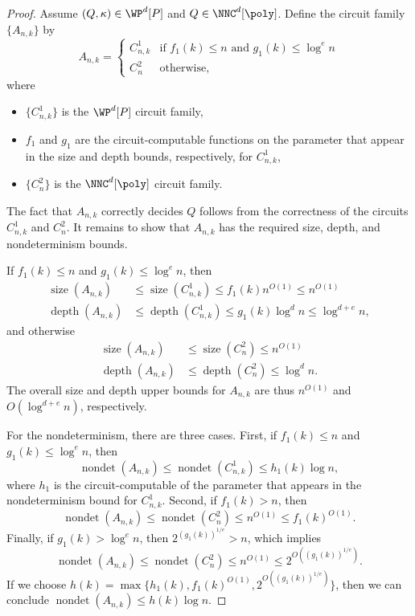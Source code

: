 \documentclass{article}
\DeclareMathOperator{\depth}{depth}
\DeclareMathOperator{\nondet}{nondet}
\DeclareMathOperator{\size}{size}
\begin{document}
\begin{proof}
  Assume $(Q, \kappa) \in \WP^d[P]$ and $Q \in \NNC^d[\poly]$.
  Define the circuit family $\{A_{n, k}\}$ by
  \[
  A_{n, k} =
  \begin{cases}
    C^1_{n, k} & \text{if } f_1(k) \leq n \text{ and } g_1(k) \leq \log^e n \\
    C^2_n & \text{otherwise},
  \end{cases}
  \]
  where
  \begin{itemize}
  \item $\{C^1_{n, k}\}$ is the $\WP^d[P]$ circuit family,
  \item $f_1$ and $g_1$ are the circuit-computable functions on the parameter that appear in the size and depth bounds, respectively, for $C^1_{n, k}$,
  \item $\{C^2_n\}$ is the $\NNC^d[\poly]$ circuit family.
  \end{itemize}
  The fact that $A_{n, k}$ correctly decides $Q$ follows from the correctness of the circuits $C^1_{n, k}$ and $C^2_n$.
  It remains to show that $A_{n, k}$ has the required size, depth, and nondeterminism bounds.

  If $f_1(k) \leq n$ and $g_1(k) \leq \log^e n$, then
  \begin{align*}
    \size(A_{n, k}) & \leq \size(C^1_{n, k}) \leq f_1(k) n^{O(1)} \leq n^{O(1)} \\
    \depth(A_{n, k}) & \leq \depth(C^1_{n, k}) \leq g_1(k) \log^d n \leq \log^{d + e} n,
  \end{align*}
  and otherwise
  \begin{align*}
    \size(A_{n, k}) & \leq \size(C^2_n) \leq n^{O(1)} \\
    \depth(A_{n, k}) & \leq \depth(C^2_n) \leq \log^d n.
  \end{align*}
  The overall size and depth upper bounds for $A_{n, k}$ are thus $n^{O(1)}$ and $O(\log^{d + e} n)$, respectively.

  For the nondeterminism, there are three cases.
  First, if $f_1(k) \leq n$ and $g_1(k) \leq \log^e n$, then
  \[
  \nondet(A_{n, k}) \leq \nondet(C^1_{n, k}) \leq h_1(k) \log n,
  \]
  where $h_1$ is the circuit-computable of the parameter that appears in the nondeterminism bound for $C^1_{n, k}$.
  Second, if $f_1(k) > n$, then
  \[
  \nondet(A_{n, k}) \leq \nondet(C^2_n) \leq n^{O(1)} \leq f_1(k)^{O(1)}.
  \]
  Finally, if $g_1(k) > \log^e n$, then $2^{(g_1(k))^{1 / e}} > n$, which implies
  \[
  \nondet(A_{n, k}) \leq \nondet(C^2_n) \leq n^{O(1)} \leq 2^{O((g_1(k))^{1 / e})}.
  \]
  If we choose $h(k) = \max\{ h_1(k), f_1(k)^{O(1)}, 2^{O((g_1(k))^{1 / e})} \}$, then we can conclude $\nondet(A_{n, k}) \leq h(k) \log n$.
\end{proof}
\end{document}

